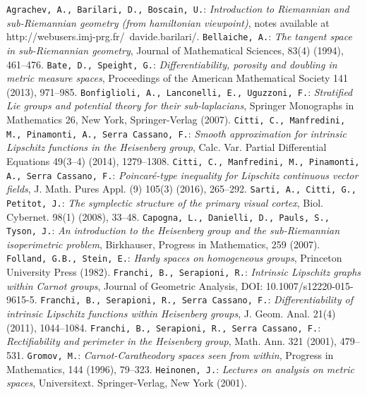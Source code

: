 \documentclass[reqno, 11pt]{amsart}
\theoremstyle{definition}
\theoremstyle{remark}
\numberwithin{theorem}{section}
\numberwithin{equation}{section}
\begin{document}
\begin{thebibliography}{99}
 \texttt{Agrachev, A., Barilari, D., Boscain, U.}: \emph{Introduction to Riemannian and sub-Riemannian geometry (from hamiltonian viewpoint)}, notes available at http://webusers.imj-prg.fr/~davide.barilari/.
 \texttt{Bellaiche, A.}: \emph{The tangent space in sub-Riemannian geometry}, Journal of Mathematical Sciences, 83(4) (1994), 461--476.
 \texttt{Bate, D., Speight, G.}: \emph{Differentiability, porosity and doubling in metric measure spaces}, Proceedings of the American Mathematical Society 141 (2013), 971--985.
 \texttt{Bonfiglioli, A., Lanconelli, E., Uguzzoni, F.}: \emph{Stratified Lie groups and potential theory for their sub-laplacians}, Springer Monographs in Mathematics 26, New York, Springer-Verlag (2007).
 \texttt{Citti, C., Manfredini, M., Pinamonti, A., Serra Cassano, F.}: \emph{Smooth approximation for intrinsic Lipschitz functions in the Heisenberg group}, Calc. Var. Partial Differential Equations 49(3--4) (2014), 1279--1308.
 \texttt{Citti, C., Manfredini, M., Pinamonti, A., Serra Cassano, F.}: \emph{Poincar\'e-type inequality for Lipschitz continuous vector fields}, J. Math. Pures Appl. (9) 105(3) (2016), 265--292.
 \texttt{Sarti, A., Citti, G., Petitot, J.}: \emph{The symplectic structure of the primary visual cortex}, Biol. Cybernet. 98(1) (2008), 33--48.
 \texttt{Capogna, L., Danielli, D., Pauls, S., Tyson, J.}: \emph{An introduction to the Heisenberg group and the sub-Riemannian isoperimetric problem}, Birkhauser, Progress in Mathematics, 259 (2007).
 \texttt{Folland, G.B., Stein, E.}: \emph{Hardy spaces on homogeneous groups}, Princeton University Press (1982).
 \texttt{Franchi, B., Serapioni, R.}: \emph{Intrinsic Lipschitz graphs within Carnot groups}, Journal of Geometric Analysis, DOI: 10.1007/s12220-015-9615-5.
 \texttt{Franchi, B., Serapioni, R., Serra Cassano, F.}: \emph{Differentiability of intrinsic Lipschitz functions within Heisenberg groups}, J. Geom. Anal. 21(4) (2011), 1044--1084.
 \texttt{Franchi, B., Serapioni, R., Serra Cassano, F.}: \emph{Rectifiability and perimeter in the Heisenberg group}, Math. Ann. 321 (2001), 479--531.
 \texttt{Gromov, M.}: \emph{Carnot-Caratheodory spaces seen from within}, Progress in Mathematics, 144 (1996), 79--323.
 \texttt{Heinonen, J.}: \emph{Lectures on analysis on metric spaces}, Universitext. Springer-Verlag, New York (2001).

\end{thebibliography}
\end{document}
